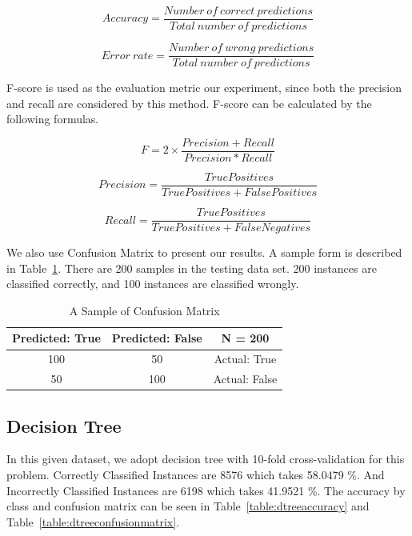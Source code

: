 \begin{equation}
Accuracy = \frac{Number\ of\ correct\ predictions}{Total\ number\ of\ predictions}
\end{equation}

\begin{equation}
Error\ rate = \frac{Number\ of\ wrong\ predictions}{Total\ number\ of\ predictions}
\end{equation}

F-score is used as the evaluation metric our experiment, since both the precision and recall are considered by this method.
F-score can be calculated by the following formulas.

\begin{equation}
F=2\times\frac{Precision+Recall}{Precision*Recall}
\end{equation}

\begin{equation}
Precision = \frac{TruePositives}{TruePositives+FalsePositives}
\end{equation}

\begin{equation}
Recall = \frac{TruePositives}{TruePositives+FalseNegatives}
\end{equation}

We also use Confusion Matrix to present our results.
A sample form is described in Table~\ref{table:sample}.
There are 200 samples in the testing data set.
200 instances are classified correctly, and 100 instances are classified wrongly.

\begin{table}
\begin{center}
\begin{tabular}{|c|c|c|}
\hline
Predicted: True & Predicted: False & N = 200 \\ \hline
100 & 50 & Actual: True \\ \hline
50 & 100 & Actual: False \\ \hline
\end{tabular}
\caption{A Sample of Confusion Matrix}
\label{table:sample}
\end{center}
\end{table}

\subsection{Decision Tree}
In this given dataset, we adopt decision tree with 10-fold cross-validation for this problem. Correctly Classified Instances are 8576 which takes 58.0479 \%. And Incorrectly Classified Instances are 6198 which takes 41.9521 \%. The accuracy by class and confusion matrix can be seen in Table~\ref{table:dtreeaccuracy} and Table~\ref{table:dtreeconfusionmatrix}.

